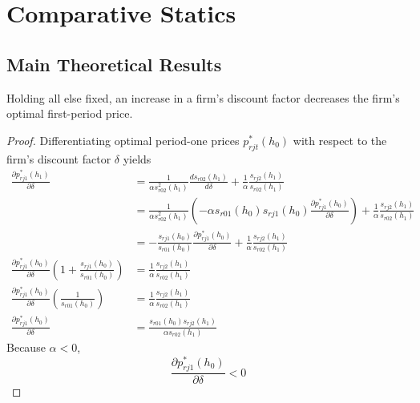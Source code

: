 
\section{Comparative Statics}
\label{sec:comparative-statics}
\subsection{Main Theoretical Results}

\begin{proposition}
\label{prop:one}
Holding all else fixed, an increase in a firm's discount factor decreases the
  firm's optimal first-period price.
\end{proposition}

\begin{proof}
  Differentiating optimal period-one prices $p_{rjt}^*(h_0)$ with respect to the
  firm's discount factor $\delta$ yields
  \begin{align*}
    \frac{\partial p_{rj1}^*(h_1)}{\partial\delta} &= \frac{1}{\alpha s^2_{r02}(h_1)}\frac{d s_{r02}(h_1)}{d\delta} + \frac{1}{\alpha}\frac{s_{rj2}(h_1)}{s_{r02}(h_1)} \\
    &= \frac{1}{\alpha s_{r02}^2(h_1)}(-\alpha
    s_{r01}(h_0)s_{rj1}(h_0)\frac{\partial p^*_{rj1}(h_0)}{\partial\delta}) +
    \frac{1}{\alpha}\frac{s_{rj2}(h_1)}{s_{r02}(h_1)} \\
    &= -\frac{s_{rj1}(h_0)}{s_{r01}(h_0)}\frac{\partial p^*_{rj1}(h_0)}{\partial\delta} +
    \frac{1}{\alpha}\frac{s_{rj2}(h_1)}{s_{r02}(h_1)} \\
    \frac{\partial
    p^*_{rj1}(h_0)}{\partial\delta}(1+\frac{s_{rj1}(h_0)}{s_{r01}(h_0)}) &=
    \frac{1}{\alpha}\frac{s_{rj2}(h_1)}{s_{r02}(h_1)} \\
    \frac{\partial
    p^*_{rj1}(h_0)}{\partial\delta}(\frac{1}{s_{r01}(h_0)}) &=
    \frac{1}{\alpha}\frac{s_{rj2}(h_1)}{s_{r02}(h_1)} \\
    \frac{\partial
    p^*_{rj1}(h_0)}{\partial\delta} &= \frac{s_{r01}(h_0)s_{rj2}(h_1)}{\alpha
    s_{r02}(h_1)}
  \end{align*}
  Because $\alpha<0$,
  \begin{equation}
    \frac{\partial p_{rj1}^*(h_0)}{\partial\delta} < 0
  \end{equation}
\end{proof}

